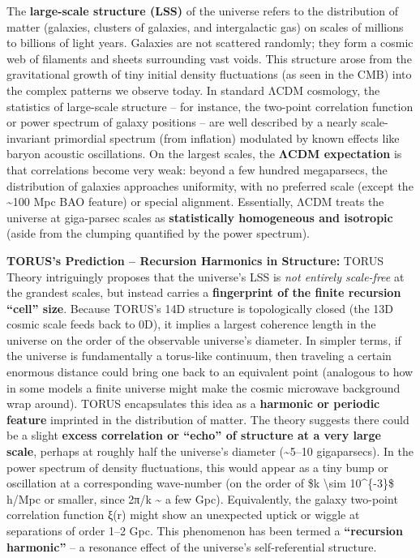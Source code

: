 \documentclass[
]{article}
\begin{document}
The \textbf{large-scale structure (LSS)} of the universe refers to the
distribution of matter (galaxies, clusters of galaxies, and
intergalactic gas) on scales of millions to billions of light years.
Galaxies are not scattered randomly; they form a cosmic web of filaments
and sheets surrounding vast voids. This structure arose from the
gravitational growth of tiny initial density fluctuations (as seen in
the CMB) into the complex patterns we observe today. In standard ΛCDM
cosmology, the statistics of large-scale structure -- for instance, the
two-point correlation function or power spectrum of galaxy positions --
are well described by a nearly scale-invariant primordial spectrum (from
inflation) modulated by known effects like baryon acoustic oscillations.
On the largest scales, the \textbf{ΛCDM expectation} is that
correlations become very weak: beyond a few hundred megaparsecs, the
distribution of galaxies approaches uniformity, with no preferred scale
(except the \textasciitilde100 Mpc BAO feature) or special alignment.
Essentially, ΛCDM treats the universe at giga-parsec scales as
\textbf{statistically homogeneous and isotropic} (aside from the
clumping quantified by the power spectrum).

\textbf{TORUS's Prediction -- Recursion Harmonics in Structure:} TORUS
Theory intriguingly proposes that the universe's LSS is \emph{not
entirely scale-free} at the grandest scales, but instead carries a
\textbf{fingerprint of the finite recursion ``cell'' size}. Because
TORUS's 14D structure is topologically closed (the 13D cosmic scale
feeds back to 0D), it implies a largest coherence length in the universe
on the order of the observable universe's diameter. In simpler terms, if
the universe is fundamentally a torus-like continuum, then traveling a
certain enormous distance could bring one back to an equivalent point
(analogous to how in some models a finite universe might make the cosmic
microwave background wrap around). TORUS encapsulates this idea as a
\textbf{harmonic or periodic feature} imprinted in the distribution of
matter\hspace{0pt}. The theory suggests there could be a slight
\textbf{excess correlation or ``echo'' of structure at a very large
scale}, perhaps at roughly half the universe's diameter
(\textasciitilde5--10 gigaparsecs)\hspace{0pt}. In the power spectrum of
density fluctuations, this would appear as a tiny bump or oscillation at
a corresponding wave-number (on the order of \$k \textbackslash sim
10\^{}\{-3\}\$ h/Mpc or smaller, since 2π/k \textasciitilde{} a few
Gpc). Equivalently, the galaxy two-point correlation function ξ(r) might
show an unexpected uptick or wiggle at separations of order 1--2
Gpc\hspace{0pt}. This phenomenon has been termed a \textbf{``recursion
harmonic''} -- a resonance effect of the universe's self-referential
structure.
\end{document}
